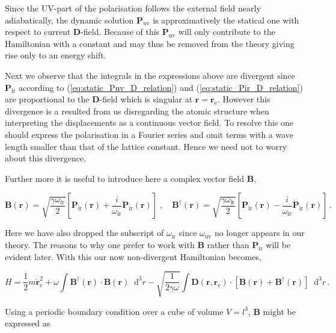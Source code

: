 \documentclass[12pt]{report}
\renewcommand{\vec}[1]{\boldsymbol{\mathbf{#1}}}                        %
\newcommand*\diff{\mathop{}\!\mathrm{d}}
\begin{document}
Since the UV-part of the polarisation follows the external field nearly adiabatically, the dynamic solution $ \vec P_\text{uv} $ is approximatively the statical one with respect to current $ \vec D $-field. Because of this $ \vec P_\text{uv} $ will only contribute to the Hamiltonian with a constant and may thus be removed from the theory giving rise only to an energy shift.

Next we observe that the integrals in the expressions above are divergent since $ \vec P_\text{ir} $ according to (\ref{eq:static_Puv_D_relation}) and (\ref{eq:static_Pir_D_relation}) are proportional to the $ \vec D $-field which is singular at $ \vec r = \vec r_\text{e} $. However this divergence is a resulted from us disregarding the atomic structure when interpreting the displacements as a continuous vector field. To resolve this one should express the polarisation in a Fourier series and omit terms with a wave length smaller than that of the lattice constant. Hence we need not to worry about this divergence.

Further more it is useful to introduce here a complex vector field $ \vec B $,

\begin{equation}
	\label{eq:B_field_def}
	\vec B(\vec r) = \sqrt{\frac{\gamma \omega_\text{ir}}{2}} \left[ \vec P_\text{ir}(\vec r) + \frac{i}{\omega_\text{ir}} \dot{\vec P}_\text{ir}(\vec r) \right]
	\; , \quad
	\vec B^\dagger(\vec r) = \sqrt{\frac{\gamma \omega_\text{ir}}{2}} \left[ \vec P_\text{ir}(\vec r) - \frac{i}{\omega_\text{ir}} \dot{\vec P}_\text{ir}(\vec r) \right] \,.
\end{equation}

Here we have also dropped the subscript of $ \omega_\text{ir} $ since $ \omega_\text{uv} $ no longer appears in our theory. The reasons to why one prefer to work with $ \vec B $ rather than $ \vec P_\text{ir} $ will be evident later. With this our now non-divergent Hamiltonian becomes,

\begin{equation}
	H = \frac{1}{2} m \dot{\vec r}_\text{e}^2
	+ \omega \int \vec B^\dagger (\vec r) \cdot \vec B (\vec r) \diff^3 r
	- \sqrt{\frac{1}{2 \gamma \omega}} \int \vec D(\vec r, \vec r_\text{e}) \cdot \left[ \vec B(\vec r) +  \vec B^\dagger(\vec r) \right] \diff^3 r \,.
\end{equation}

Using a periodic boundary condition over a cube of volume $ V = l^3 $, $ \vec B $ might be expressed as
\end{document}
